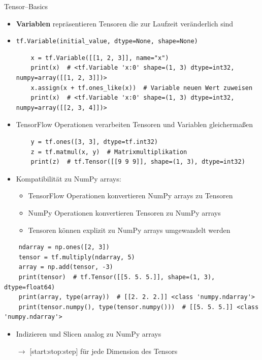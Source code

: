 \documentclass[utf8, smaller, c]{beamer}
\renewcommand{\tt}[1]{{\texttt{#1}}}
\begin{document}
\begin{frame}{Tensor--Basics}
    \framebreak

	\begin{itemize}
		\item \textbf{Variablen} repräsentieren Tensoren die zur Laufzeit veränderlich sind
		\item \tt{tf.Variable(initial\_value, dtype=None, shape=None)} 
		\begin{lstlisting}
	x = tf.Variable([[1, 2, 3]], name="x")
    print(x)  # <tf.Variable 'x:0' shape=(1, 3) dtype=int32, numpy=array([[1, 2, 3]])>
    x.assign(x + tf.ones_like(x))  # Variable neuen Wert zuweisen
    print(x)  # <tf.Variable 'x:0' shape=(1, 3) dtype=int32, numpy=array([[2, 3, 4]])>
		\end{lstlisting}
		\item TensorFlow Operationen verarbeiten Tensoren und Variablen gleichermaßen
		\begin{lstlisting}
	y = tf.ones([3, 3], dtype=tf.int32)
    z = tf.matmul(x, y)  # Matrixmultiplikation
    print(z)  # tf.Tensor([[9 9 9]], shape=(1, 3), dtype=int32)
		\end{lstlisting}
	\end{itemize}
	
	\framebreak
	
	\begin{itemize}
	    \item Kompatibilität zu NumPy arrays:
	    \begin{itemize}
	        \item TensorFlow Operationen konvertieren NumPy arrays zu Tensoren
	        \item NumPy Operationen konvertieren Tensoren zu NumPy arrays
	        \item Tensoren können explizit zu NumPy arrays umgewandelt werden
	    \end{itemize}
	\end{itemize}
	\begin{lstlisting}
    ndarray = np.ones([2, 3])
    tensor = tf.multiply(ndarray, 5)
    array = np.add(tensor, -3)
    print(tensor)  # tf.Tensor([[5. 5. 5.]], shape=(1, 3), dtype=float64)
    print(array, type(array))  # [[2. 2. 2.]] <class 'numpy.ndarray'>
    print(tensor.numpy(), type(tensor.numpy()))  # [[5. 5. 5.]] <class 'numpy.ndarray'>
	\end{lstlisting}
	\begin{itemize}
	    \item Indizieren und Slicen analog zu NumPy arrays
	    \item[$\rightarrow$] [start:stop:step] für jede Dimension des Tensors
	\end{itemize}
\end{frame}
\end{document}
